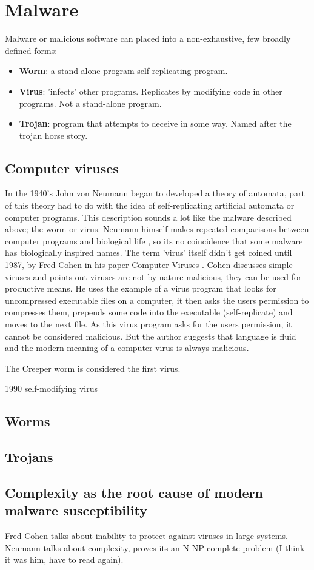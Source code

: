 \section{Malware}
Malware or malicious software can placed into a non-exhaustive, few broadly defined forms:
\begin{itemize}
\item \textbf{Worm}: a stand-alone program self-replicating program.\\
\item \textbf{Virus}: 'infects' other programs. Replicates by modifying code in other programs. Not a stand-alone program.
\item \textbf{Trojan}: program that attempts to deceive in some way. Named after the trojan horse story.
\end{itemize}

\subsection{Computer viruses}
In the 1940's John von Neumann began to developed a theory of automata, part of this theory had to do with the idea of self-replicating artificial automata \cite{neumann} or computer programs. This description sounds a lot like the malware described above; the worm or virus. Neumann himself makes repeated comparisons between computer programs and biological life \cite{neumannA}, so its no coincidence that some malware has biologically inspired names. The term 'virus' itself didn't get coined until 1987, by  Fred Cohen in his paper Computer Viruses \cite{cohen}. Cohen discusses simple viruses and points out viruses are not by nature malicious, they can be used for productive means. He uses the example of a virus program that looks for uncompressed executable files on a computer, it then asks the users permission to compresses them, prepends some code into the executable (self-replicate) and moves to the next file. As this virus program asks for the users permission, it cannot be considered malicious. But the author suggests that language is fluid and the modern meaning of a computer virus is always malicious. 

The Creeper worm is considered the first virus.

1990 self-modifying virus

\subsection{Worms}


\subsection{Trojans}


\subsection{Complexity as the root cause of modern malware susceptibility}
Fred Cohen talks about inability to protect against viruses in large systems.
Neumann talks about complexity, proves its an N-NP complete problem (I think it was him, have to read again).
